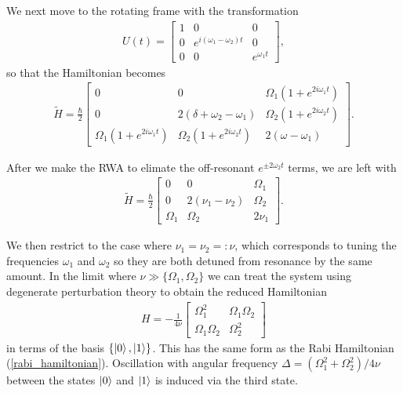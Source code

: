 We next move to the rotating frame with the transformation
\begin{align}
  U(t) = 
  \begin{bmatrix}
    1 & 0 & 0 \\
    0 & e^{i(\omega_1 - \omega_2)t} & 0 \\
    0 & 0 & e^{\omega_1 t}
  \end{bmatrix},
\end{align}
so that the Hamiltonian becomes
\begin{align}
  \tilde{H}=\frac{\hbar}{2}
  \begin{bmatrix}
    0 & 0 & \Omega_1(1+e^{2i\omega_1 t}) \\
    0 & 2(\delta + \omega_2 - \omega_1) & \Omega_2 (1+e^{2i\omega_2 t}) \\
    \Omega_1(1+e^{2i\omega_1 t}) & \Omega_2 (1+e^{2i\omega_2 t}) & 2(\omega - \omega_1)
  \end{bmatrix}.
\end{align}

After we make the RWA to elimate the off-resonant $e^{\pm2\omega_2 t}$ terms, we are left with 
\begin{align}
  \tilde{H}=\frac{\hbar}{2}
  \begin{bmatrix}
    0 & 0 & \Omega_1 \\
    0 & 2(\nu_1 - \nu_2) & \Omega_2  \\
    \Omega_1 & \Omega_2  & 2\nu_1
  \end{bmatrix}.
\end{align}

We then restrict to the case where $\nu_1 = \nu_2 =: \nu$, which corresponds to tuning the frequencies $\omega_1$ and $\omega_2$ so they are both detuned from resonance by the same amount. In the limit where $\nu \gg \{\Omega_1, \Omega_2\}$ we can treat the system using degenerate perturbation theory to obtain the reduced Hamiltonian
\begin{align}
  H = -\frac{1}{4\nu}
  \begin{bmatrix}
    \Omega_1^2 & \Omega_1 \Omega_2 \\
    \Omega_1\Omega_2 & \Omega_2^2
  \end{bmatrix}
\end{align}
in terms of the basis $\{\left\vert0\right\rangle, \left\vert1\right\rangle\}$. This has the same form as the Rabi Hamiltonian (\ref{rabi_hamiltonian}). Oscillation with angular frequency $\Delta = (\Omega_1^2 + \Omega_2^2)/4\nu$ between the states $\left\vert0\right\rangle$ and $\left\vert1\right\rangle$ is induced via the third state.



